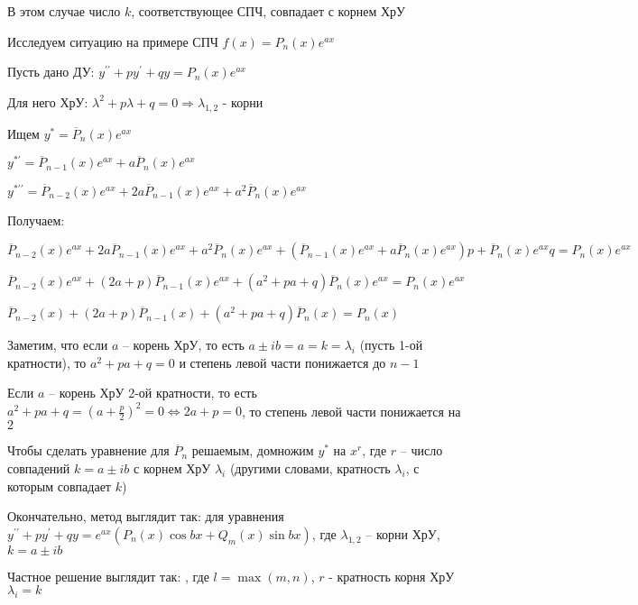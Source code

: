 \documentclass[12pt]{article}
\begin{document}
    В этом случае число $k$, соответствующее СПЧ, совпадает с корнем ХрУ

    \smallvspace

    Исследуем ситуацию на примере СПЧ $f(x) = P_n(x) e^{ax}$

    Пусть дано ДУ: $y^{\prime\prime} + py^\prime + qy = P_n(x)e^{ax}$

    Для него ХрУ: $\lambda^2 + p\lambda + q = 0 \Longrightarrow \lambda_{1,2}$ - корни

    Ищем $y^* = \overline{P}_n(x) e^{ax}$

    $y^{*\prime} = \overline{P}_{n - 1} (x) e^{ax} + a\overline{P}_n(x) e^{ax}$

    $y^{*\prime\prime} = \overline{P}_{n - 2} (x) e^{ax} + 2a\overline{P}_{n - 1} (x) e^{ax} + a^2\overline{P}_n(x) e^{ax}$

    Получаем:

    $\overline{P}_{n - 2} (x) e^{ax} + 2a\overline{P}_{n - 1} (x) e^{ax} + a^2\overline{P}_n(x) e^{ax} + (\overline{P}_{n - 1} (x) e^{ax} + a\overline{P}_n(x) e^{ax})p + \overline{P}_n(x) e^{ax} q = P_n(x) e^{ax}$

    $\overline{P}_{n - 2} (x) e^{ax} + (2a + p)\overline{P}_{n - 1} (x) e^{ax} + (a^2 + pa + q)\overline{P}_n(x) e^{ax} = P_n(x) e^{ax}$

    $\overline{P}_{n - 2} (x) + (2a + p)\overline{P}_{n - 1} (x) + (a^2 + pa + q)\overline{P}_n(x) = P_n(x)$

    \smallvspace

    Заметим, что если $a$ -- корень ХрУ, то есть $a \pm ib = a = k = \lambda_i$ (пусть 1-ой кратности), то $a^2 + pa + q = 0$ и степень
    левой части понижается до $n - 1$

    Если $a$ -- корень ХрУ 2-ой кратности, то есть $a^2 + pa + q = \left(a + \frac{p}{2}\right)^2 = 0 \Longleftrightarrow 2a + p = 0$, то степень левой части понижается на $2$

    Чтобы сделать уравнение для $\overline{P}_n$ решаемым, домножим $y^*$ на $x^r$, где $r$ -- число совпадений $k = a \pm ib$ с корнем ХрУ $\lambda_i$ (другими словами, кратность $\lambda_i$, с которым совпадает $k$)

    \mediumvspace

    Окончательно, метод выглядит так: для уравнения $y^{\prime\prime} + py^\prime + qy = e^{ax} (P_n(x)\cos bx + Q_m (x)\sin bx)$, где $\lambda_{1,2}$ -- корни ХрУ, $k = a \pm ib$

    Частное решение выглядит так: , где $l = \max(m, n)$, $r$ - кратность корня ХрУ $\lambda_i = k$
\end{document}
